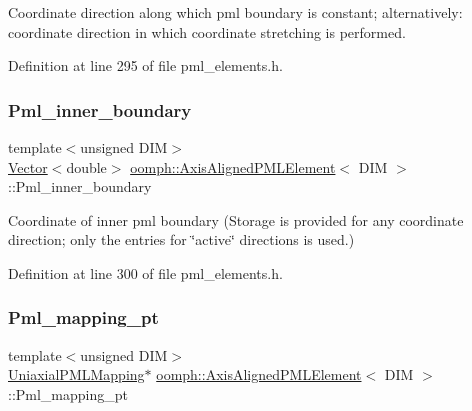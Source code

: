 Coordinate direction along which pml boundary is constant; alternatively\+: coordinate direction in which coordinate stretching is performed. 



Definition at line 295 of file pml\+\_\+elements.\+h.

\mbox{\label{classoomph_1_1AxisAlignedPMLElement_adecf1b401aeab5399ce576c19667e455}} 
\subsubsection{\texorpdfstring{Pml\+\_\+inner\+\_\+boundary}{Pml\_inner\_boundary}}
{\footnotesize\ttfamily template$<$unsigned D\+IM$>$ \\
\hyperlink{classoomph_1_1Vector}{Vector}$<$double$>$ \hyperlink{classoomph_1_1AxisAlignedPMLElement}{oomph\+::\+Axis\+Aligned\+P\+M\+L\+Element}$<$ D\+IM $>$\+::Pml\+\_\+inner\+\_\+boundary\hspace{0.3cm}{\ttfamily [protected]}}



Coordinate of inner pml boundary (Storage is provided for any coordinate direction; only the entries for \char`\"{}active\char`\"{} directions is used.) 



Definition at line 300 of file pml\+\_\+elements.\+h.

\mbox{\label{classoomph_1_1AxisAlignedPMLElement_abb5b63cb5d08885239627640a74dd9d9}} 
\subsubsection{\texorpdfstring{Pml\+\_\+mapping\+\_\+pt}{Pml\_mapping\_pt}}
{\footnotesize\ttfamily template$<$unsigned D\+IM$>$ \\
\hyperlink{classoomph_1_1UniaxialPMLMapping}{Uniaxial\+P\+M\+L\+Mapping}$\ast$ \hyperlink{classoomph_1_1AxisAlignedPMLElement}{oomph\+::\+Axis\+Aligned\+P\+M\+L\+Element}$<$ D\+IM $>$\+::Pml\+\_\+mapping\+\_\+pt\hspace{0.3cm}{\ttfamily [protected]}}




